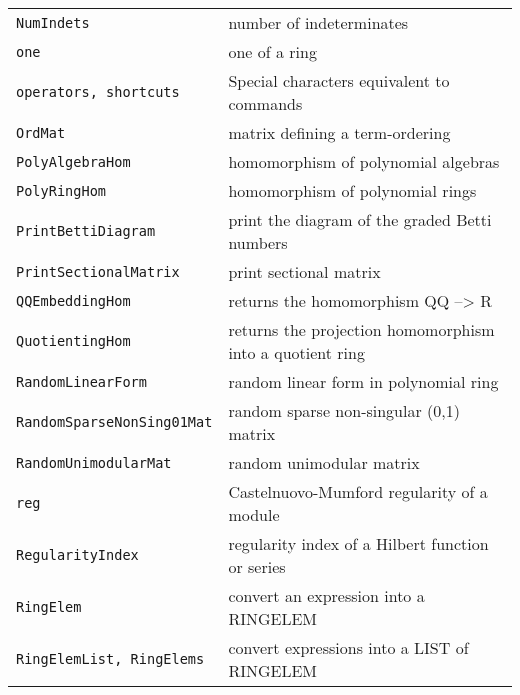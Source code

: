 \documentclass[a4paper]{mybook}
\begin{document}
\begin{center}
\begin{longtable}{ll}
{\verb~NumIndets~} &
      number of indeterminates\\
   
{\verb~one~} &
      one of a ring\\
   
{\verb~operators, shortcuts~} &
      Special characters equivalent to commands\\
   
{\verb~OrdMat~} &
      matrix defining a term-ordering\\
   
{\verb~PolyAlgebraHom~} &
      homomorphism of polynomial algebras\\
   
{\verb~PolyRingHom~} &
      homomorphism of polynomial rings\\
   
{\verb~PrintBettiDiagram~} &
      print the diagram of the graded Betti numbers\\
   
{\verb~PrintSectionalMatrix~} &
      print sectional matrix\\
   
{\verb~QQEmbeddingHom~} &
      returns the homomorphism QQ --> R\\
   
{\verb~QuotientingHom~} &
      returns the projection homomorphism into a quotient ring\\
   
{\verb~RandomLinearForm~} &
      random linear form in polynomial ring\\
   
{\verb~RandomSparseNonSing01Mat~} &
      random sparse non-singular (0,1) matrix\\
   
{\verb~RandomUnimodularMat~} &
      random unimodular matrix\\
   
{\verb~reg~} &
      Castelnuovo-Mumford regularity of a module\\
   
{\verb~RegularityIndex~} &
      regularity index of a Hilbert function or series\\
   
{\verb~RingElem~} &
      convert an expression into a RINGELEM\\
   
{\verb~RingElemList, RingElems~} &
      convert expressions into a LIST of RINGELEM\\
   

\end{longtable}
\end{center}
\end{document}
